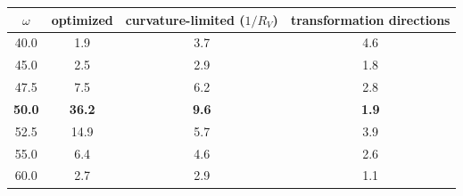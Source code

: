 \begin{tabular}{@{}cccc@{}}
\toprule
$\omega$ & optimized & curvature-limited ($1/R_V$) & transformation directions\\ \midrule
40.0 & 1.9 & 3.7 & 4.6\\
45.0 & 2.5 & 2.9 & 1.8\\
47.5 & 7.5 & 6.2 & 2.8\\
\bf 50.0 & \bf 36.2 & \bf 9.6 & \bf 1.9\\
52.5 & 14.9 & 5.7 & 3.9\\
55.0 & 6.4 & 4.6 & 2.6\\
60.0 & 2.7 & 2.9 & 1.1\\
\bottomrule
\end{tabular}
